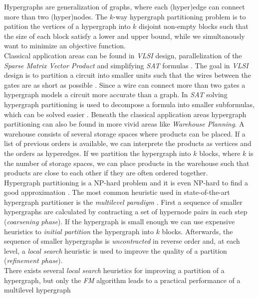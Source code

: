 Hypergraphs are generalization of graphs, where each (hyper)edge can connect 
more than two (hyper)nodes. The $k$-way hypergraph partitioning problem is to 
patition the vertices of a hypergraph into $k$ disjoint non-empty blocks such
that the size of each block satisfy a lower and upper bound, while we simultanously 
want to minimize an objective function. \\
Classical application areas can be found in \emph{VLSI} design, parallelization of
the \emph{Sparse Matrix Vector Product} and simplifying \emph{SAT} formulas 
\cite{karypis1999multilevel, mann2014formula, papa2007hypergraph}. The goal 
in \emph{VLSI} design is to partition a circuit into smaller units such that
the wires between the gates are as short as possible \cite{bulucc2016recent}.
Since a wire can connect more than two gates a hypergraph models a circuit more
accurate than a graph. In \emph{SAT} solving hypergraph partitioning is used to
decompose a formula into smaller subformulas, which can be solved easier \cite{mann2014formula}.
Beneath the classical application areas hypergraph partitioning can also be found
in more vivid areas like \emph{Warehouse Planning}. A warehouse consists of several
storage spaces where products can be placed. If a list of previous orders is available, 
we can interprete the products as vertices and the orders as hyperedges. If we
partition the hypergraph into $k$ blocks, where $k$ is the number of storage spaces,
we can place products in the warehouse such that products are close to each other if
they are often ordered together.\\
Hypergraph partitioning is a NP-hard problem \cite{lengauer2012combinatorial} and
it is even NP-hard to find a good approximation \cite{bui1992finding}.
The most common heuristic used in state-of-the-art hypergraph partitioner is the
\emph{multilevel paradigm} \cite{catalyurek1999hypergraph, heuer2017improving, karypis1999multilevel}.
First a sequence of smaller hypergraphs are calculated by contracting a set of hypernode pairs
in each step (\emph{coarsening phase}). If the hypergraph is small enough we can use expensive
heuristics to \emph{initial partition} the hypergraph into $k$ blocks. Afterwards, the sequence
of smaller hypergraphs is \emph{uncontracted} in reverse order and, at each level, a 
\emph{local search} heuristic is used to improve the quality of a partition 
(\emph{refinement phase}). \\
There exists several \emph{local search} heuristics for improving a partition of a hypergraph,
but only the \emph{FM} algorithm leads to a practical performance of a multilevel hypergraph

